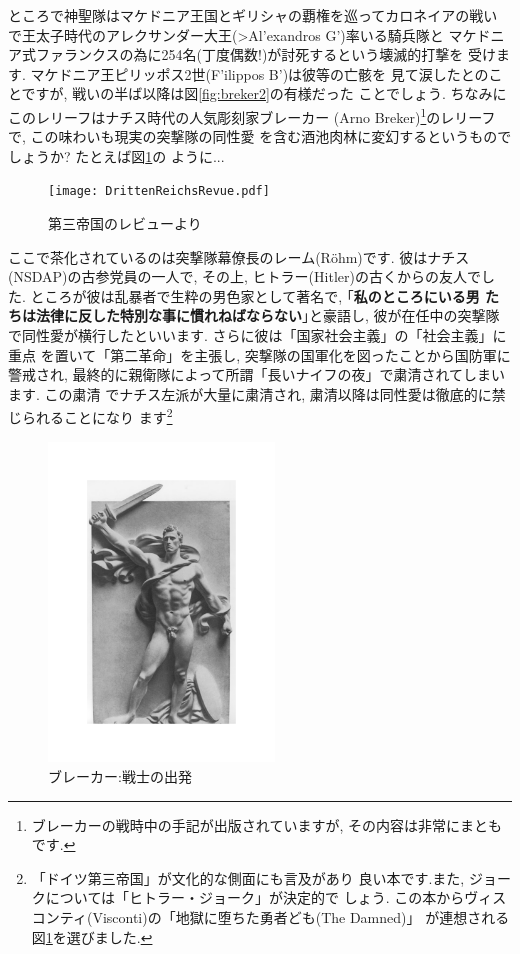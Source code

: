 \documentclass[b5j,8pt,twocolumn]{ltjsarticle}
\newcommand{\textgreek}[1]{\begingroup\fontencoding{LGR}\selectfont#1\endgroup}
\newcommand{\textgreek}[1]{\begingroup\fontencoding{LGR}\selectfont#1\endgroup}
\begin{document}
ところで神聖隊はマケドニア王国とギリシャの覇権を巡ってカロネイアの戦い
で王太子時代のアレクサンダー大王(\textgreek{>Al'exandros G'})率いる騎兵隊と
マケドニア式ファランクスの為に254名(丁度偶数!)が討死するという壊滅的打撃を
受けます. マケドニア王ピリッポス2世(\textgreek{F'ilippos B'})は彼等の亡骸を
見て涙したとのことですが, 戦いの半ば以降は図\ref{fig:breker2}の有様だった
ことでしょう. ちなみにこのレリーフはナチス時代の人気彫刻家ブレーカー
(Arno Breker)\footnote{ブレーカーの戦時中の手記が出版されていますが,
 その内容は非常にまともです.}のレリーフで, この味わいも現実の突撃隊の同性愛
を含む酒池肉林に変幻するというものでしょうか? たとえば図\ref{fig:rrevue}の
ように... 

\begin{figure}[htbp]
\begin{center}
\texttt{[image: DrittenReichsRevue.pdf]}
\caption{第三帝国のレビューより\cite{関}}
\label{fig:rrevue}
\end{center}
\end{figure}

ここで茶化されているのは突撃隊幕僚長のレーム(R\"ohm)です. 彼はナチス
(NSDAP)の古参党員の一人で, その上, ヒトラー(Hitler)の古くからの友人でした.
 ところが彼は乱暴者で生粋の男色家として著名で, ｢\textbf{私のところにいる男
 たちは法律に反した特別な事に慣れねばならない}｣と豪語し, 彼が在任中の突撃隊
で同性愛が横行したといいます. さらに彼は「国家社会主義」の「社会主義」に重点
を置いて「第二革命」を主張し, 突撃隊の国軍化を図ったことから国防軍に警戒され,
最終的に親衛隊によって所謂「長いナイフの夜」で粛清されてしまいます. この粛清
でナチス左派が大量に粛清され, 粛清以降は同性愛は徹底的に禁じられることになり
ます\footnote{「ドイツ第三帝国」\cite{クラーザー}が文化的な側面にも言及があり
良い本です.また, ジョークについては「ヒトラー・ジョーク」\cite{関}が決定的で
しょう. この本からヴィスコンティ(Visconti)の「地獄に堕ちた勇者ども(The Damned)」
が連想される図\ref{fig:rrevue}を選びました.}
\newpage

\begin{figure}
\includegraphics[width=6cm]{Breker2_relief.pdf}
\caption{ブレーカー:戦士の出発}
\label{fig:breker1}
\end{figure}
\end{document}
